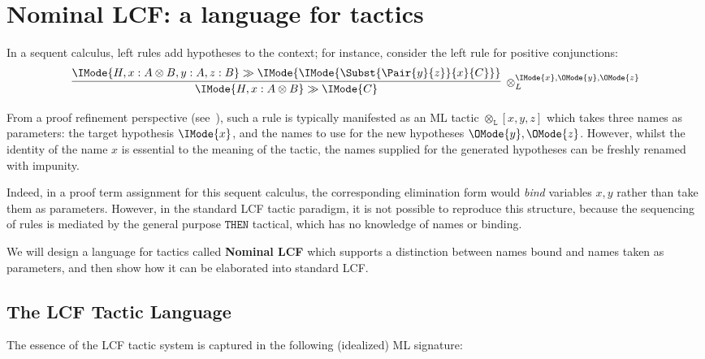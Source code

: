 \chapter{Nominal LCF: a language for tactics}

In a sequent calculus, left rules add hypotheses to the context; for instance,
consider the left rule for positive conjunctions:
\[
  \infer[{\otimes_L^{\IMode{x},\OMode{y},\OMode{z}}}]{
    \IMode{H,x:A\otimes B}\gg\IMode{C}
  }{
    \IMode{H,x:A\otimes B,y:A,z:B}\gg\IMode{
      \IMode{\Subst{\Pair{y}{z}}{x}{C}}
    }
  }
\]
%

From a proof refinement perspective (see~\cite{constable:1986}), such a rule is
typically manifested as an ML tactic $\mathtt{\otimes_L}[x,y,z]$ which takes
three names as parameters: the target hypothesis $\IMode{x}$, and the names to
use for the new hypotheses $\OMode{y},\OMode{z}$. However, whilst the identity
of the name $x$ is essential to the meaning of the tactic, the names supplied
for the generated hypotheses can be freshly renamed with impunity.

Indeed, in a proof term assignment for this sequent calculus, the corresponding
elimination form would \emph{bind} variables $x,y$ rather than take them as
parameters. However, in the standard LCF tactic paradigm, it is not possible to
reproduce this structure, because the sequencing of rules is mediated by the
general purpose $\mathtt{THEN}$ tactical, which has no knowledge of names or
binding.

We will design a language for tactics called \textbf{Nominal LCF} which
supports a distinction between names bound and names taken as parameters, and
then show how it can be elaborated into standard LCF.

\section{The LCF Tactic Language}
\newcommand\MLTypeDecl[1]{\mathtt{type}\ #1}
\newcommand\PartialFun[2]{#1\rightharpoonup #2}
\newcommand\LCFJudgment{\mathit{judgment}}
\newcommand\LCFEvidence{\mathit{evidence}}
\newcommand\LCFTactic{\mathit{tactic}}
\newcommand\MLList[1]{#1\;\mathit{list}}
\newcommand\MLAtom{\mathbb{A}}
\newcommand\MLNat{\mathbb{N}}
\newcommand\MLStream[1]{{#1}^{\MLNat}}
\newcommand\LCFAtomicTactic{\mathit{atactic}}
\newcommand\StreamTake[2]{\bar{#1}(#2)}

The essence of the LCF tactic system is captured in the following (idealized)
ML signature:

